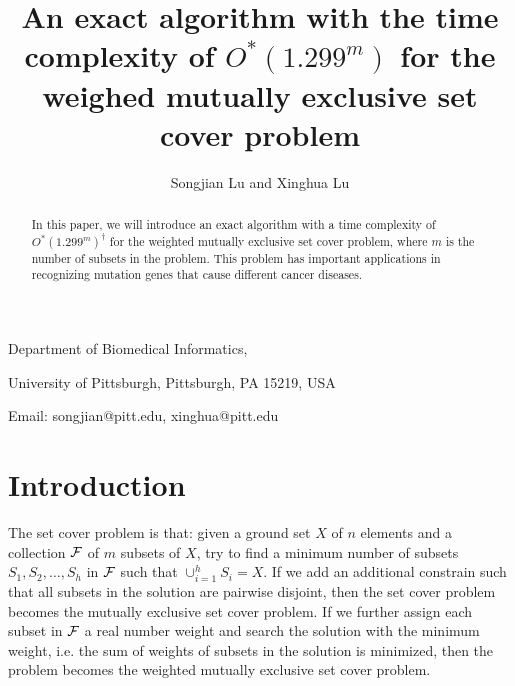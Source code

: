 \documentclass[11pt]{article}
\begin{document}
\title{An exact algorithm with the time complexity of $O^*(1.299^m)$  for the weighed mutually exclusive set cover problem}

\author{Songjian Lu and Xinghua Lu}

\date{}

\maketitle

\vspace{-0.8cm}
\begin{center} Department of Biomedical Informatics,

University of Pittsburgh, Pittsburgh, PA 15219, USA

Email: songjian@pitt.edu, xinghua@pitt.edu
\end{center}



\begin{abstract}
In this paper, we will introduce an exact algorithm with a time
complexity of $O^*(1.299^m)^{\dag}$
\let\thefootnote\relax{} for the {\sc
weighted mutually exclusive set cover} problem, where $m$ is the
number of subsets in the problem. This problem has important
applications in recognizing mutation genes that cause different
cancer diseases.
\end{abstract}


\section{Introduction}
The {\sc set cover} problem is that: given a ground set $X$ of $n$
elements and a collection ${\cal F}$ of $m$ subsets of $X$, try to
find a minimum number of subsets $S_1,S_2,\ldots,S_h$ in ${\cal
F}$ such that $\cup_{i=1}^hS_i = X$. If we add an additional
constrain such that all subsets in the solution are pairwise
disjoint, then the {\sc set cover} problem becomes the {\sc
mutually exclusive set cover} problem. If we further assign each
subset in ${\cal F}$ a real number weight and search the solution
with the minimum weight, i.e. the sum of weights of subsets in the
solution is minimized, then the problem becomes the {\sc weighted
mutually exclusive set cover} problem.
\end{document}
